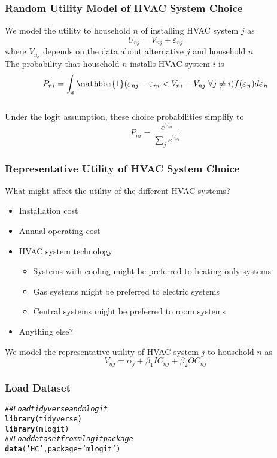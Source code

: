 \documentclass{beamer}\usepackage[]{graphicx}\usepackage[]{color}
\makeatletter
\newcommand{\hlstr}[1]{\textcolor[rgb]{0.192,0.494,0.8}{#1}}%
\newcommand{\hlcom}[1]{\textcolor[rgb]{0.678,0.584,0.686}{\textit{#1}}}%
\newcommand{\hlstd}[1]{\textcolor[rgb]{0.345,0.345,0.345}{#1}}%
\newcommand{\hlkwc}[1]{\textcolor[rgb]{0.333,0.667,0.333}{#1}}%
\newcommand{\hlkwd}[1]{\textcolor[rgb]{0.737,0.353,0.396}{\textbf{#1}}}%
\newenvironment{kframe}{%
 \def\at@end@of@kframe{}%
 \ifinner\ifhmode%
  \def\at@end@of@kframe{\end{minipage}}%
  \begin{minipage}{\columnwidth}%
 \fi\fi%
 \def\FrameCommand##1{\hskip\@totalleftmargin \hskip-\fboxsep
 \colorbox{shadecolor}{##1}\hskip-\fboxsep
     \hskip-\linewidth \hskip-\@totalleftmargin \hskip\columnwidth}%
 \MakeFramed {\advance\hsize-\width
   \@totalleftmargin\z@ \linewidth\hsize
   \@setminipage}}%
 {\par\unskip\endMakeFramed%
 \at@end@of@kframe}
\newenvironment{knitrout}{}{} %
\makeatother
\begin{document}
\begin{frame}\frametitle{Random Utility Model of HVAC System Choice}
    We model the utility to household $n$ of installing HVAC system $j$ as
    $$U_{nj} = V_{nj} + \varepsilon_{nj}$$
    where $V_{nj}$ depends on the data about alternative $j$ and household $n$ \\
    \vspace{3ex}
    The probability that household $n$ installs HVAC system $i$ is
 	$$P_{ni} = \int_{\bm{\varepsilon}} \mathbbm{1}(\varepsilon_{nj} - \varepsilon_{ni} < V_{ni} - V_{nj} \; \forall j \neq i) f(\bm{\varepsilon}_n) d\bm{\varepsilon}_n$$ \\
 	\vspace{2ex}
  	Under the logit assumption, these choice probabilities simplify to
    $$P_{ni} = \frac{e^{V_{ni}}}{\sum_j e^{V_{nj}}}$$
\end{frame}

\begin{frame}\frametitle{Representative Utility of HVAC System Choice}
	What might affect the utility of the different HVAC systems?
	\begin{itemize}
		\item Installation cost
		\item Annual operating cost
		\item HVAC system technology
		\begin{itemize}
			\item Systems with cooling might be preferred to heating-only systems
			\item Gas systems might be preferred to electric systems
			\item Central systems might be preferred to room systems
		\end{itemize}
		\item Anything else?
	\end{itemize}
    \vspace{3ex}
    We model the representative utility of HVAC system $j$ to household $n$ as
    $$V_{nj} = \alpha_j + \beta_1 IC_{nj} + \beta_2 OC_{nj}$$
\end{frame}

\begin{frame}[fragile]\frametitle{Load Dataset}
\begin{knitrout}\footnotesize
{}\color{fgcolor}\begin{kframe}
\begin{alltt}
\hlcom{## Load tidyverse and mlogit}
\hlkwd{library}\hlstd{(tidyverse)}
\hlkwd{library}\hlstd{(mlogit)}
\hlcom{## Load dataset from mlogit package}
\hlkwd{data}\hlstd{(}\hlstr{'HC'}\hlstd{,} \hlkwc{package} \hlstd{=} \hlstr{'mlogit'}\hlstd{)}
\end{alltt}
\end{kframe}
\end{knitrout}
\end{frame}
\end{document}
